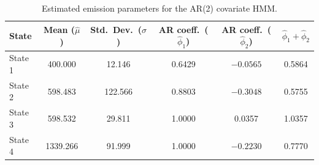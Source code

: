 \begin{table}[ht]
\centering
\begin{tabular}{lccccc}
\hline
State & Mean ($\hat{\mu}$) & Std.\ Dev.\ ($\hat{\sigma}$) & AR coeff.\ ($\hat{\phi}_1$) & AR coeff.\ ($\hat{\phi}_2$) & $\hat{\phi}_1 + \hat{\phi}_2$ \\
\hline
State 1 & 400.000 & 12.146 & 0.6429 & $-0.0565$ & 0.5864 \\
State 2 & 598.483 & 122.566 & 0.8803 & $-0.3048$ & 0.5755 \\
State 3 & 598.532 & 29.811 & 1.0000 & 0.0357 & 1.0357 \\
State 4 & 1339.266 & 91.999 & 1.0000 & $-0.2230$ & 0.7770 \\
\hline
\end{tabular}
\caption{Estimated emission parameters for the AR(2) covariate HMM.}
\label{tab:ar_2_covariate_hmm_emissions}
\end{table}
